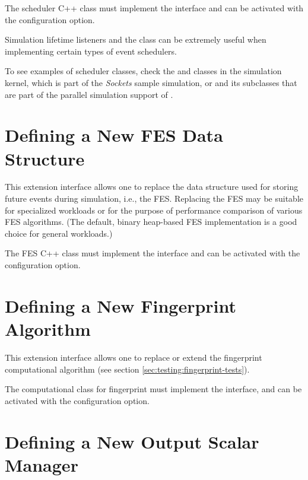 The scheduler C++ class must implement the  interface and can
be activated with the  configuration option.

Simulation lifetime listeners and the  class can be extremely
useful when implementing certain types of event schedulers.

To see examples of scheduler classes, check the 
and  classes in the simulation kernel,
 which is part of the \textit{Sockets} sample
simulation, or  and its subclasses that are part of
the parallel simulation support of {\opp}.


\section{Defining a New FES Data Structure}
\label{sec:plugin-exts:fes}

This extension interface allows one to replace the data structure used for
storing future events during simulation, i.e., the FES. Replacing the FES
may be suitable for specialized workloads or for the purpose of performance
comparison of various FES algorithms. (The default, binary heap-based FES
implementation is a good choice for general workloads.)

The FES C++ class must implement the  interface
and can be activated with the  configuration option.


\section{Defining a New Fingerprint Algorithm}
\label{sec:plugin-exts:fingerprint}

This extension interface allows one to replace or extend the fingerprint
computational algorithm (see section \ref{sec:testing:fingerprint-tests}).


The computational class for fingerprint must implement the
 interface, and can be activated with the
 configuration option.


\section{Defining a New Output Scalar Manager}
\label{sec:plugin-exts:outputscalarmanager}

